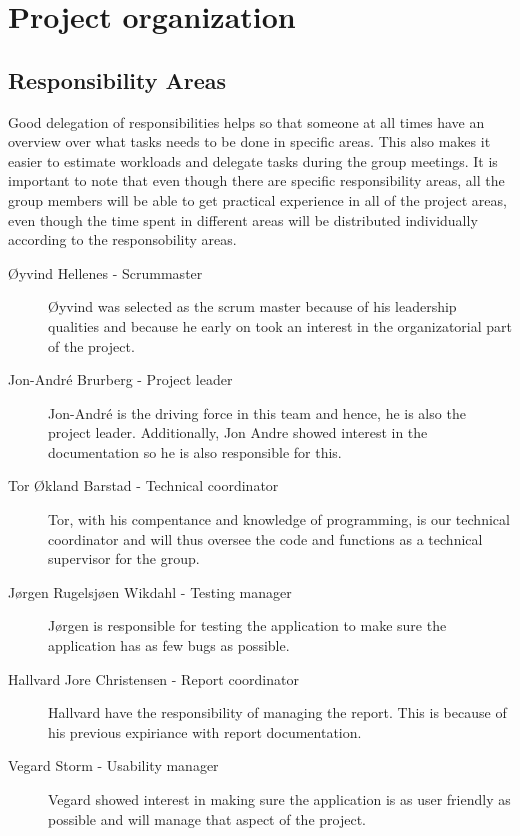 \section{Project organization}
	\subsection{Responsibility Areas}

Good delegation of responsibilities helps so that someone at all times have an overview over what tasks needs to be done in specific areas. This also makes it easier to estimate workloads and delegate tasks during the group meetings. It is important to note that even though there are specific responsibility areas, all the group members will be able to get practical experience in all of the project areas, even though the time spent in different areas will be distributed individually according to the responsobility areas.

\begin{description}
\item[Øyvind Hellenes - Scrummaster] Øyvind was selected as the scrum master because of his leadership qualities and because he early on took an interest in the organizatorial part of the project.
\item[Jon-André Brurberg - Project leader] Jon-André is the driving force in this team and hence, he is also the project leader. Additionally, Jon Andre showed interest in the documentation so he is also responsible for this.
\item[Tor Økland Barstad - Technical coordinator] Tor, with his compentance and knowledge of programming, is our technical coordinator and will thus oversee the code and functions as a technical supervisor for the group.
\item[Jørgen Rugelsjøen Wikdahl - Testing manager] Jørgen is responsible for testing the application to make sure the application has as few bugs as possible.
\item[Hallvard Jore Christensen - Report coordinator] Hallvard have the responsibility of managing the report. This is because of his previous expiriance with report documentation.
\item[Vegard Storm - Usability manager] Vegard showed interest in making sure the application is as user friendly as possible and will manage that aspect of the project.
\end{description}
	
